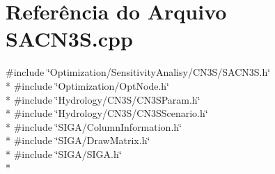 \section{Referência do Arquivo S\+A\+C\+N3\+S.\+cpp}
\label{_s_a_c_n3_s_8cpp}
{\ttfamily \#include \char`\"{}Optimization/\+Sensitivity\+Analisy/\+C\+N3\+S/\+S\+A\+C\+N3\+S.\+h\char`\"{}}\\*
{\ttfamily \#include \char`\"{}Optimization/\+Opt\+Node.\+h\char`\"{}}\\*
{\ttfamily \#include \char`\"{}Hydrology/\+C\+N3\+S/\+C\+N3\+S\+Param.\+h\char`\"{}}\\*
{\ttfamily \#include \char`\"{}Hydrology/\+C\+N3\+S/\+C\+N3\+S\+Scenario.\+h\char`\"{}}\\*
{\ttfamily \#include \char`\"{}S\+I\+G\+A/\+Column\+Information.\+h\char`\"{}}\\*
{\ttfamily \#include \char`\"{}S\+I\+G\+A/\+Draw\+Matrix.\+h\char`\"{}}\\*
{\ttfamily \#include \char`\"{}S\+I\+G\+A/\+S\+I\+G\+A.\+h\char`\"{}}\\*
